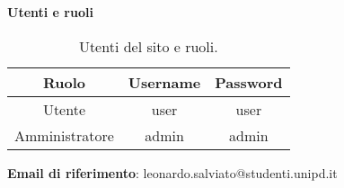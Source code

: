 \begin{center}
    \textbf{Utenti e ruoli}
\end{center}
\begin{table}[H]
    \centering
    \begin{tabular}{|c|c|c|}
        \hline
        \cellcolor[HTML]{FFCC00} \textbf{Ruolo} & \cellcolor[HTML]{FFCC00} \textbf{Username} & \cellcolor[HTML]{FFCC00} \textbf{Password}       \\ 
        \hline
        Utente & user & user \\ 
        \hline
        Amministratore & admin & admin\\ 
        \hline
    \end{tabular}
    \caption{Utenti del sito e ruoli.}
\end{table}

\begin{center}
    \textbf{Email di riferimento}:
    leonardo.salviato@studenti.unipd.it
\end{center}